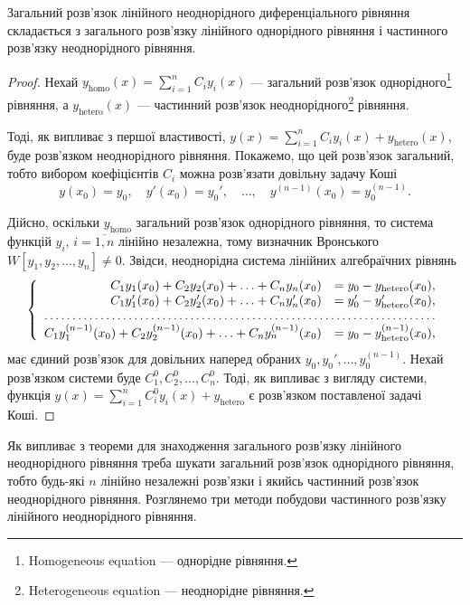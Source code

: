 \begin{theorem}
	Загальний розв'язок лінійного неоднорідного диференціального рівняння складається з загального розв'язку лінійного однорідного рівняння і частинного розв'язку неоднорідного рівняння.
\end{theorem}
\begin{proof}
	Нехай $y_{\text{homo}}(x) = \sum_{i = 1}^n C_i y_i(x)$ --- загальний розв'язок однорідного\footnote{Homogeneous equation --- однорідне рівняння.} рівняння, а $y_{\text{hetero}}(x)$ --- частинний розв'язок неоднорідного\footnote{Heterogeneous equation --- неоднорідне рівняння.} рівняння. \parvskip

	Тоді, як випливає з першої властивості, $y(x) = \sum_{i = 1}^n C_i y_i(x) + y_{\text{hetero}}(x)$, буде розв'язком неоднорідного рівняння. Покажемо, що цей розв'язок  загальний, тобто вибором коефіцієнтів $C_i$ можна розв'язати довільну задачу Коші
	\begin{equation*}
		y(x_0) = y_0, \quad y'(x_0) = y_0', \quad \ldots, \quad y^{(n - 1)}(x_0) = y_0^{(n - 1)}.
	\end{equation*}

	Дійсно, оскільки $y_{\text{homo}}$ загальний роз\-в'яз\-ок однорідного рівняння, то система функцій $y_i$, $i = \overline{1, n}$ лінійно незалежна, тому визначник Вронського $W[y_1, y_2, \ldots, y_n] \ne 0$. Звідси, неоднорідна система лінійних алгебраїчних рівнянь 
	\begin{equation*}
		\left\{ \begin{array}{rl}
			C_1 y_1(x_0) + C_2 y_2(x_0) + \ldots + C_n y_n(x_0) &= y_0 - y_{\text{hetero}}(x_0), \\
			C_1 y_1'(x_0) + C_2 y_2'(x_0) + \ldots + C_n y_n'(x_0) &= y_0' - y_{\text{hetero}}'(x_0), \\
			\hdotsfor{2} \\
			C_1 y_1^{(n - 1)}(x_0) + C_2 y_2^{(n - 1)}(x_0) + \ldots + C_n y_n^{(n - 1)}(x_0) &= y_0 - y_{\text{hetero}}^{(n - 1)}(x_0),
		\end{array} \right.
	\end{equation*}
	має єдиний роз\-в'яз\-ок для довільних наперед обраних $y_0, y_0', \ldots, y_0^{(n - 1)}$. Нехай роз\-в'яз\-ком системи буде $C_1^0, C_2^0, \ldots, C_n^0$. Тоді, як випливає з вигляду системи, функція $y(x) = \sum_{i = 1}^n C_i^0 y_i(x) + y_{\text{hetero}}$ є роз\-в'яз\-ком поставленої задачі Коші.
\end{proof}

Як випливає з теореми для знаходження загального розв'язку лінійного неоднорідного рівняння треба шукати загальний розв'язок однорідного рівняння, тобто будь-які $n$ лінійно незалежні розв'язки і якийсь частинний розв'язок неоднорідного рівняння. Розглянемо три методи побудови частинного розв'язку лінійного неоднорідного рівняння.